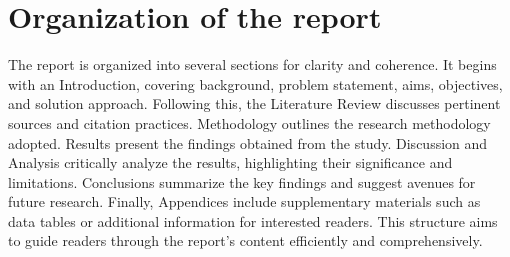 \section{Organization of the report} %
\label{sec:intro_org} %
The report is organized into several sections for clarity and coherence. It begins with an Introduction, covering background, problem statement, aims, objectives, and solution approach. Following this, the Literature Review discusses pertinent sources and citation practices. Methodology outlines the research methodology adopted. Results present the findings obtained from the study. Discussion and Analysis critically analyze the results, highlighting their significance and limitations. Conclusions summarize the key findings and suggest avenues for future research. Finally, Appendices include supplementary materials such as data tables or additional information for interested readers. This structure aims to guide readers through the report's content efficiently and comprehensively.

